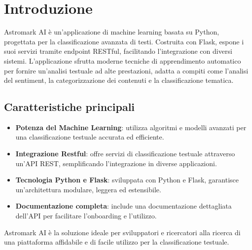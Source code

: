 
\chapter{Introduzione}

\sloppy
Astromark AI è un'applicazione di machine learning basata su Python, progettata per la classificazione avanzata di testi. Costruita con Flask, espone i suoi servizi tramite endpoint RESTful, facilitando l'integrazione con diversi sistemi. L'applicazione sfrutta moderne tecniche di apprendimento automatico per fornire un'analisi testuale ad alte prestazioni, adatta a compiti come l'analisi del sentiment, la categorizzazione dei contenuti e la classificazione tematica.

\section{Caratteristiche principali}

\begin{itemize}
    \item \textbf{Potenza del Machine Learning}: utilizza algoritmi e modelli avanzati per una classificazione testuale accurata ed efficiente.
    \item \textbf{Integrazione Restful}: offre servizi di classificazione testuale attraverso un'API REST, semplificando l'integrazione in diverse applicazioni.
    \item \textbf{Tecnologia Python e Flask}: sviluppata con Python e Flask, garantisce un'architettura modulare, leggera ed estensibile.
    \item \textbf{Documentazione completa}: include una documentazione dettagliata dell'API per facilitare l'onboarding e l'utilizzo.
\end{itemize}

Astromark AI è la soluzione ideale per sviluppatori e ricercatori alla ricerca di una piattaforma affidabile e di facile utilizzo per la classificazione testuale.
